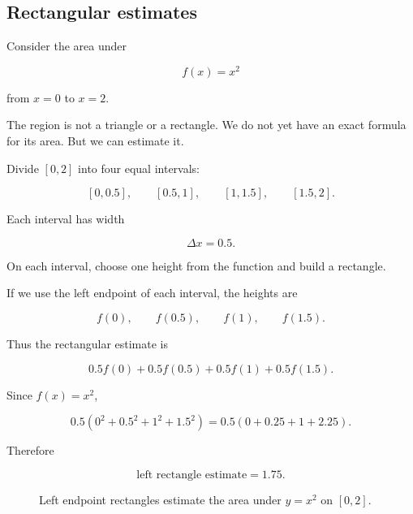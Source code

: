 \subsection{Rectangular estimates}
\label{subsec:rectangular-estimates}

Consider the area under

\[
f(x)=x^2
\]

from \(x=0\) to \(x=2\).

The region is not a triangle or a rectangle.  We do not yet have an exact formula for
its area.  But we can estimate it.

Divide \([0,2]\) into four equal intervals:

\[
[0,0.5],\qquad [0.5,1],\qquad [1,1.5],\qquad [1.5,2].
\]

Each interval has width

\[
\Delta x=0.5.
\]

On each interval, choose one height from the function and build a rectangle.

If we use the left endpoint of each interval, the heights are

\[
f(0),\qquad f(0.5),\qquad f(1),\qquad f(1.5).
\]

Thus the rectangular estimate is

\[
0.5f(0)+0.5f(0.5)+0.5f(1)+0.5f(1.5).
\]

Since \(f(x)=x^2\),

\[
0.5\left(0^2+0.5^2+1^2+1.5^2\right)
=
0.5(0+0.25+1+2.25).
\]

Therefore

\[
\text{left rectangle estimate}=1.75.
\]

\begin{figure}[h]
\centering
{}
\caption{Left endpoint rectangles estimate the area under \(y=x^2\) on \([0,2]\).}
\label{fig:left-rectangles-x-squared}
\end{figure}

